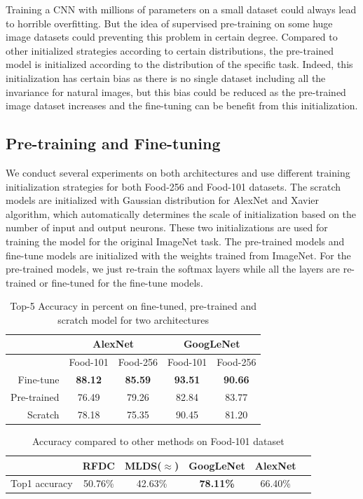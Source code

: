 ﻿Training a CNN with millions of parameters on a small dataset could always lead to horrible overfitting. But the idea of supervised pre-training on some huge image datasets could preventing this problem in certain degree. Compared to other initialized strategies according to certain distributions, the pre-trained model is initialized according to the distribution of the specific task. Indeed, this initialization has certain bias as there is no single dataset including all the invariance for natural images\cite{agrawal2014analyzing}, but this bias could be reduced as the pre-trained image dataset increases and the fine-tuning can be benefit from this initialization.
\subsection{Pre-training and Fine-tuning}
We conduct several experiments on both architectures and use different training initialization strategies for both Food-256 and Food-101 datasets. The scratch models are initialized with Gaussian distribution for AlexNet and Xavier algorithm\cite{glorot2010understanding}, which automatically determines the scale of initialization based on the number of input and output neurons. These two initializations are used for training the model for the original ImageNet task. The pre-trained models and fine-tune models are initialized with the weights trained from ImageNet. For the pre-trained models, we just re-train the softmax layers while all the layers are re-trained or fine-tuned for the fine-tune models.
\begin{table}[htbp]
  \centering
  \caption{Top-5 Accuracy in percent on fine-tuned, pre-trained and scratch model for two architectures}
    \begin{tabular}{r|cc|cc}
    \toprule
          & \multicolumn{2}{c|}{AlexNet} & \multicolumn{2}{c}{GoogLeNet} \\    \midrule
     & Food-101   & Food-256   & Food-101   & Food-256 \\
    Fine-tune & \textbf{88.12} & \textbf{85.59} & \textbf{93.51} & \textbf{90.66} \\
    Pre-trained &76.49	&79.26&	82.84	&83.77\\
    Scratch & 78.18 & 75.35 & 90.45 & 81.20 \\
    \bottomrule
    \end{tabular}%
  \label{tab:ft}%
\end{table}%

\begin{table}[htbp]
  \centering
  \caption{Accuracy compared to other methods on Food-101 dataset}
    \begin{tabular}{c|ccccc}
    \toprule
          & RFDC\cite{bossard14} & MLDS($\approx$\cite{singh2012unsupervised}) & GoogLeNet & AlexNet \\
    \midrule
    Top1 accuracy & 50.76\% & 42.63\%& \textbf{78.11\% }& 66.40\% \\
    \bottomrule
    \end{tabular}%
\end{table}%




